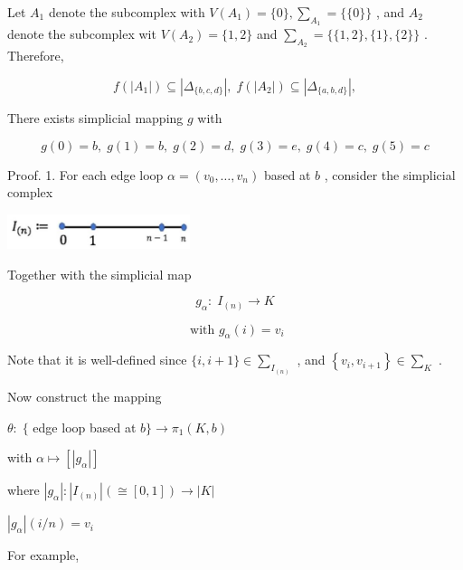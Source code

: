 Let \({A}_{1}\) denote the subcomplex with \(V\left( {A}_{1}\right)  = \{ 0\} ,{\sum }_{{A}_{1}} = \{ \{ 0\} \}\) , and \({A}_{2}\) denote the subcomplex wit \(V\left( {A}_{2}\right)  = \{ 1,2\}\) and \({\sum }_{{A}_{2}} = \{ \{ 1,2\} ,\{ 1\} ,\{ 2\} \}\) . Therefore,

\[
f\left( \left| {A}_{1}\right| \right)  \subseteq  \left| {\Delta }_{\{ b,c,d\} }\right| ,\;f\left( \left| {A}_{2}\right| \right)  \subseteq  \left| {\Delta }_{\{ a,b,d\} }\right| ,
\]

There exists simplicial mapping \(g\) with

\[
g\left( 0\right)  = b,\;g\left( 1\right)  = b,\;g\left( 2\right)  = d,\;g\left( 3\right)  = e,\;g\left( 4\right)  = c,\;g\left( 5\right)  = c
\]

Proof. 1. For each edge loop \(\alpha  = \left( {{v}_{0},\ldots ,{v}_{n}}\right)\) based at \(b\) , consider the simplicial complex

\begin{center}
\includegraphics[max width=0.4\textwidth]{images/bo_d2bcsrref24c73avs720_129_718_891_475_90_0.jpg}
\end{center}
\hspace*{3em} 

Together with the simplicial map

\[
{g}_{\alpha } : \;{I}_{\left( n\right) } \rightarrow  K
\]

\[
\text{ with }{g}_{\alpha }\left( i\right)  = {v}_{i}
\]

Note that it is well-defined since \(\{ i,i + 1\}  \in  {\sum }_{{I}_{\left( n\right) }}\) , and \(\left\{  {{v}_{i},{v}_{i + 1}}\right\}   \in  {\sum }_{K}\) .

Now construct the mapping

\(\theta  : \;\{\) edge loop based at \(b\}  \rightarrow  {\pi }_{1}\left( {K,b}\right)\)

with \(\alpha  \mapsto  \left\lbrack  \left| {g}_{\alpha }\right| \right\rbrack\)

where \(\left| {g}_{\alpha }\right|  : \left| {I}_{\left( n\right) }\right| \left( { \cong  \left\lbrack  {0,1}\right\rbrack  }\right)  \rightarrow  \left| K\right|\)

\(\left| {g}_{\alpha }\right| \left( {i/n}\right)  = {v}_{i}\)

For example,

